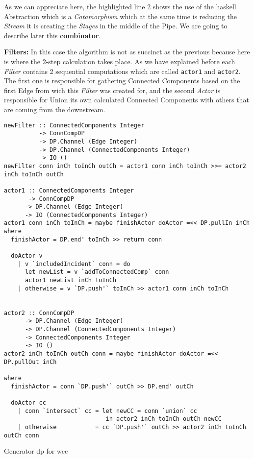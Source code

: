 \documentclass[12pt]{article}
\begin{document}
As we can appreciate here, the highlighted line 2 shows the use of the \acrshort{haskell} Abstraction which is a \textit{Catamorphism} which at the same time is reducing the \textit{Stream}
it is creating the \textit{Stages} in the middle of the Pipe. We are going to describe later this \textbf{combinator}.

\textbf{Filters:}
In this case the algorithm is not as succinct as the previous because here is where the 2-step calculation takes place. As we have explained before each \textit{Filter} contains 2 sequential 
computations which are called \texttt{actor1} and \texttt{actor2}. The first one is responsible for gathering Connected Components based on the first Edge from wich 
this \textit{Filter} was created for, and the second \textit{Actor} is responsible for Union its own calculated Connected Components with others that are coming from the downstream.

\begin{listing}[H]
\begin{verbatim}
newFilter :: ConnectedComponents Integer
          -> ConnCompDP
          -> DP.Channel (Edge Integer)
          -> DP.Channel (ConnectedComponents Integer)
          -> IO ()
newFilter conn inCh toInCh outCh = actor1 conn inCh toInCh >>= actor2 inCh toInCh outCh

actor1 :: ConnectedComponents Integer 
       -> ConnCompDP 
      -> DP.Channel (Edge Integer) 
      -> IO (ConnectedComponents Integer)
actor1 conn inCh toInCh = maybe finishActor doActor =<< DP.pullIn inCh
where
  finishActor = DP.end' toInCh >> return conn

  doActor v
    | v `includedIncident` conn = do
      let newList = v `addToConnectedComp` conn
      actor1 newList inCh toInCh
    | otherwise = v `DP.push'` toInCh >> actor1 conn inCh toInCh


actor2 :: ConnCompDP
      -> DP.Channel (Edge Integer)
      -> DP.Channel (ConnectedComponents Integer)
      -> ConnectedComponents Integer
      -> IO ()
actor2 inCh toInCh outCh conn = maybe finishActor doActor =<< DP.pullOut inCh

where
  finishActor = conn `DP.push'` outCh >> DP.end' outCh

  doActor cc 
    | conn `intersect` cc = let newCC = conn `union` cc 
                             in actor2 inCh toInCh outCh newCC
    | otherwise           = cc `DP.push'` outCh >> actor2 inCh toInCh outCh conn
\end{verbatim}
\caption{Generator \acrshort{dp} for \acrshort{wcc}}
\label{src:haskell:3}
\end{listing}
\end{document}
